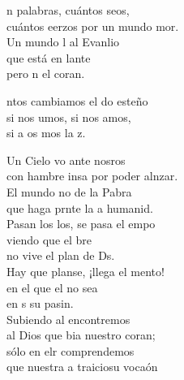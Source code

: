 \begin{cancion}%
	n palabras, cuántos seos,\\
	cuántos eerzos por un mundo mor.\\
	Un mundo l al Evanlio\\
	que está en lante \\
	pero n el coran. \jump\\
	\begin{chorus}%
		ntos cambiamos el do esteño\\
		si nos umos, si nos amos,\\
		si a os mos la z.\jump\\
	\end{chorus}%
	Un Cielo vo ante nosros\\
	con hambre insa por poder alnzar.\\
	El mundo no de la Pabra\\
	que haga prnte la a humanid.\\
	\jump
	Pasan los los, se pasa el empo\\
	viendo que el bre \\
	no vive el plan de Ds.\\
	Hay que planse, ¡llega el mento!\\
	en el que el no sea \\
	en s su pasin.\\
	\jump
	Subiendo al  encontremos\\
	al Dios que bia nuestro coran; \\
	sólo en elr comprendemos\\
	que nuestra a traiciosu vocaón\\
\end{cancion}%
